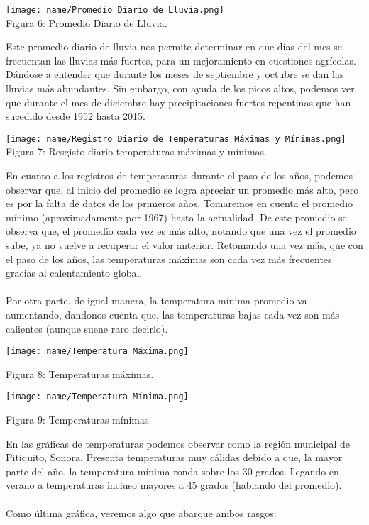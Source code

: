 \documentclass{article}
\begin{document}
\begin{center}
\texttt{[image: name/Promedio Diario de Lluvia.png]}\\
\caption{\small Figura 6: Promedio Diario de Lluvia.}
\end{center}
Este promedio diario de lluvia nos permite determinar en que días del mes se frecuentan las lluvias más fuertes, para un mejoramiento en cuestiones agrícolas. Dándose a entender que durante los meses de septiembre y octubre se dan las lluvias más abundantes. Sin embargo, con ayuda de los picos altos, podemos ver que durante el mes de diciembre hay precipitaciones fuertes repentinas que han sucedido desde 1952 hasta 2015.
\begin{center}
    \texttt{[image: name/Registro Diario de Temperaturas Máximas y Mínimas.png]}\\
    \caption{\small Figura 7: Resgisto diario temperaturas máximas y mínimas.}
\end{center}
En cuanto a los registros de temperaturas durante el paso de los años, podemos observar que, al inicio del promedio se logra apreciar un promedio más alto, pero es por la falta de datos de los primeros años. Tomaremos en cuenta el promedio mínimo (aproximadamente por 1967) hasta la actualidad. De este promedio se observa que, el promedio cada vez es más alto, notando que una vez el promedio sube, ya no vuelve a recuperar el valor anterior. Retomando una vez más, que con el paso de los años, las temperaturas máximas son cada vez más frecuentes gracias al calentamiento global.\\\\Por otra parte, de igual manera, la temperatura mínima promedio va aumentando, dandonos cuenta que, las temperaturas bajas cada vez son más calientes (aunque suene raro decirlo).
\begin{center}
    \texttt{[image: name/Temperatura Máxima.png]}
    \caption{\small Figura 8: Temperaturas máximas.}
    \texttt{[image: name/Temperatura Mínima.png]}
    \caption{\small Figura 9: Temperaturas mínimas.}
    
\end{center}
En las gráficas de temperaturas podemos observar como la región municipal de Pitiquito, Sonora. Presenta temperaturas muy cálidas debido a que, la mayor parte del año, la temperatura mínima ronda sobre los 30 grados. llegando en verano a temperaturas incluso mayores a 45 grados (hablando del promedio).\\\\Como última gráfica, veremos algo que abarque ambos rasgos:
\end{document}
